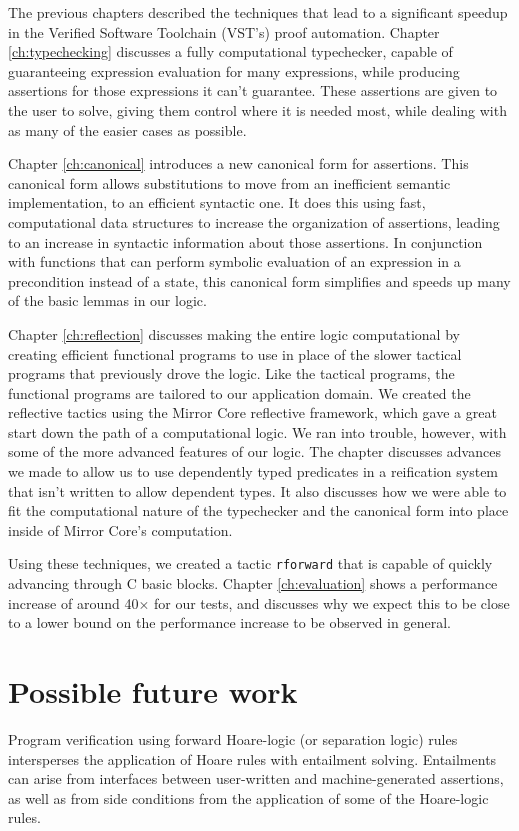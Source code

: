 \documentclass{puthesis}
\begin{document}
The previous chapters described the techniques that lead to a
significant speedup in the Verified Software Toolchain (VST's) proof
automation. Chapter \ref{ch:typechecking} discusses a fully
computational typechecker, capable of guaranteeing expression
evaluation for many expressions, while producing assertions for those
expressions it can't guarantee. These assertions are given to the
user to solve, giving them control where it is needed most,
while dealing with as many of the easier cases as possible. 

Chapter \ref{ch:canonical} introduces a new canonical form for
assertions. This canonical form allows substitutions to move from an
inefficient semantic implementation, to an efficient syntactic one. It
does this using fast, computational data structures to increase the
organization of assertions, leading to an increase in syntactic
information about those assertions. In conjunction with functions that
can perform symbolic evaluation of an expression in a precondition
instead of a state, this canonical form simplifies and speeds up many
of the basic lemmas in our logic.

Chapter \ref{ch:reflection} discusses making the entire logic
computational by creating efficient functional programs to use in
place of the slower tactical programs that previously drove the
logic. Like the tactical programs, the functional programs are
tailored to our application domain. We created the reflective tactics
using the Mirror Core reflective framework, which gave a great start
down the path of a computational logic. We ran into trouble, however,
with some of the more advanced features of our logic. The chapter
discusses advances we made to allow us to use dependently typed
predicates in a reification system that isn't written to allow
dependent types. It also discusses how we were able to fit the
computational nature of the typechecker and the canonical form into
place inside of Mirror Core's computation.

Using these techniques, we created a tactic \lstinline|rforward| that
is capable of quickly advancing through C basic blocks. Chapter
\ref{ch:evaluation} shows a performance increase of around 40$\times$
for our tests, and discusses why we expect this to be close to a lower
bound on the performance increase to be observed in general.

\section{Possible future work}
\label{sec:future}
Program verification using forward Hoare-logic (or separation logic)
rules intersperses the application of Hoare rules with entailment
solving. Entailments can arise from interfaces between user-written
and machine-generated assertions, as well as from side conditions from
the application of some of the Hoare-logic rules.
\end{document}
